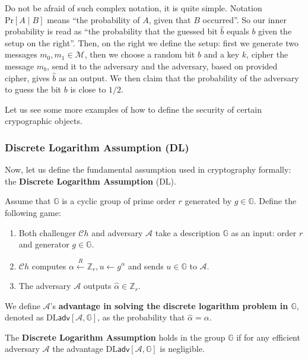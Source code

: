 \documentclass[../lecture-notes.tex]{subfiles}
\begin{document}
Do not be afraid of such complex notation, it is quite simple. Notation $\text{Pr}[A \mid B]$ means ``the probability of $A$, given that $B$ occurred''. So our inner probability is read as ``the probability that the guessed bit $\hat{b}$ equals $b$ given the setup on the right''. Then, on the right we define the setup: first we generate two messages $m_0,m_1 \in \mathcal{M}$, then we choose a random bit $b$ and a key $k$, cipher the message $m_b$, send it to the adversary and the adversary, based on provided cipher, gives $\hat{b}$ as an output. We then claim that the probability of the adversary to guess the bit $b$ is close to $1/2$.

Let us see some more examples of how to define the security of certain crypographic objects.

\subsubsection{Discrete Logarithm Assumption (DL)}

Now, let us define the fundamental assumption used in cryptography formally: the \textbf{Discrete Logarithm Assumption} (DL).

\begin{definition}
    Assume that $\mathbb{G}$ is a cyclic group of prime order $r$ generated by $g \in \mathbb{G}$. Define the following game:
    \begin{enumerate}
        \item Both challenger $\mathcal{C}h$ and adversary $\mathcal{A}$ take a description $\mathbb{G}$ as an input: order $r$ and generator $g \in \mathbb{G}$.
        \item $\mathcal{C}h$ computes $\alpha \xleftarrow{R} \mathbb{Z}_r, u \gets g^{\alpha}$ and sends $u \in \mathbb{G}$ to $\mathcal{A}$.
        \item The adversary $\mathcal{A}$ outputs $\hat{\alpha} \in \mathbb{Z}_r$.
    \end{enumerate}

    We define $\mathcal{A}$'s \textbf{advantage in solving the discrete logarithm problem in $\mathbb{G}$}, denoted as $\text{DL}\mathsf{adv}[\mathcal{A},\mathbb{G}]$, as the probability that $\hat{\alpha} = \alpha$.
\end{definition}

\begin{definition}
    The \textbf{Discrete Logarithm Assumption} holds in the group $\mathbb{G}$ if for any efficient adversary $\mathcal{A}$ the advantage $\text{DL}\mathsf{adv}[\mathcal{A},\mathbb{G}]$ is negligible.
\end{definition}
\end{document}
